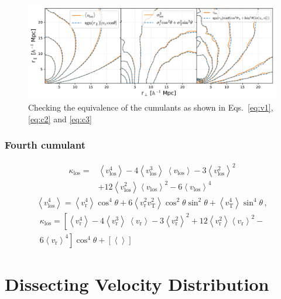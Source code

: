 \documentclass[a4paper,fleqn,usenatbib]{mnras}
\begin{document}
	\begin{figure}
	\centering
	\includegraphics[scale=0.7]{cumulants}
	\caption{Checking the equivalence of the cumulants as shown in Eqs.~\ref{eq:v1}, \ref{eq:c2} and \ref{eq:c3}}
	\label{fig:cumulants}
\end{figure}
	\subsubsection{Fourth cumulant}
	\begin{eqnarray}
		\kappa_{\mathrm{los}}  = & \left\langle v^4_{\mathrm{los}}\right\rangle - 4\left\langle v^3_{\mathrm{los}}\right\rangle\ \left\langle v_{\mathrm{los}}\right\rangle - 3\left\langle v^2_{\mathrm{los}}\right\rangle^2 \nonumber \\
		& + 12\left\langle v^2_{\mathrm{los}}\right\rangle\left\langle v_{\mathrm{los}}\right\rangle^2 - 6\left\langle v_{\mathrm{los}}\right\rangle^4
	\end{eqnarray}
	\begin{eqnarray}
		\left\langle v^4_{\mathrm{los}}\right\rangle = \left\langle v^4_{\mathrm{r}}\right\rangle\cos^4\theta + 6\left\langle v^2_{\mathrm{r}}v^2_{\mathrm{T}}\right\rangle  \cos^2\theta\sin^2\theta + \left\langle v^4_{\mathrm{T}}\right\rangle\sin^4\theta \, ,
	\end{eqnarray}
	\begin{multline}
		\kappa_{\mathrm{los}} = \left[ \left\langle v^4_{\mathrm{r}}\right\rangle - 4\left\langle v^3_{\mathrm{r}}\right\rangle\ \left\langle v_{\mathrm{r}}\right\rangle - 3\left\langle v^2_{\mathrm{r}}\right\rangle^2 + 12\left\langle v^2_{\mathrm{r}}\right\rangle\left\langle v_{\mathrm{r}}\right\rangle^2 - \right.\nonumber\\
		\left. 6\left\langle v_{\mathrm{r}}\right\rangle^4\right]\cos^4\theta + \left[\left\langle\right\rangle\right]
	\end{multline}
	\section{Dissecting Velocity Distribution}
	
\end{document}
